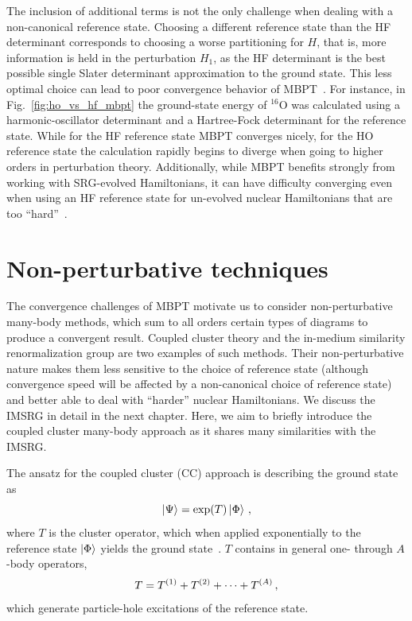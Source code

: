 The inclusion of additional terms is not the only challenge when dealing with a non-canonical reference state.
Choosing a different reference state than the HF determinant
corresponds to choosing a worse partitioning for $H$,
that is, more information is held in the perturbation $H_1$,
as the HF determinant is the best possible single Slater determinant approximation
to the ground state.
This less optimal choice can lead to poor convergence behavior of MBPT~\cite{Tich16hohfmbpt}.
For instance, in Fig.~\ref{fig:ho_vs_hf_mbpt}
the ground-state energy of ${}^{16}\text{O}$ was calculated
using a harmonic-oscillator determinant and a Hartree-Fock determinant
for the reference state.
While for the HF reference state MBPT converges nicely,
for the HO reference state the calculation rapidly begins to diverge
when going to higher orders in perturbation theory.
Additionally,
while MBPT benefits strongly from working with SRG-evolved Hamiltonians,
it can have difficulty converging even when using an HF reference state
for un-evolved nuclear Hamiltonians that are too ``hard''~\cite{Tich20mbptreview}.

\section{Non-perturbative techniques}

The convergence challenges of MBPT motivate us to consider non-perturbative many-body methods,
which sum to all orders certain types of diagrams to produce a convergent result.
Coupled cluster theory and the in-medium similarity renormalization group
are two examples of such methods.
Their non-perturbative nature makes them less sensitive to the choice of reference state
(although convergence speed will be affected by a non-canonical choice of reference state)
and better able to deal with ``harder'' nuclear Hamiltonians.
We discuss the IMSRG in detail in the next chapter.
Here, we aim to briefly introduce the coupled cluster many-body approach
as it shares many similarities with the IMSRG.\@

The ansatz for the coupled cluster (CC) approach is describing the ground state as
\begin{equation}
  \ket{\Psi} = \exp(T)\ket{\Phi}\,,
\end{equation}
where $T$ is the cluster operator,
which when applied exponentially to the reference state $\ket{\Phi}$ yields the ground state~\cite{Hage13ccreview}.
$T$ contains in general one- through $A$-body operators,
\begin{equation}
  T = {T}^{(1)} + {T}^{(2)} + \cdots + {T}^{(A)}\,,
\end{equation}
which generate particle-hole excitations of the reference state.

